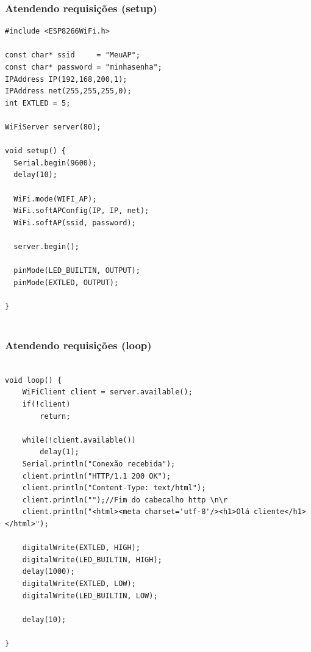 \documentclass{beamer}
\begin{document}
\begin{frame}[fragile]
\frametitle{Atendendo requisições (setup)}

\tiny
\begin{lstlisting}
#include <ESP8266WiFi.h>

const char* ssid     = "MeuAP";
const char* password = "minhasenha";
IPAddress IP(192,168,200,1);
IPAddress net(255,255,255,0);
int EXTLED = 5;

WiFiServer server(80);

void setup() {
  Serial.begin(9600);
  delay(10);

  WiFi.mode(WIFI_AP); 
  WiFi.softAPConfig(IP, IP, net);
  WiFi.softAP(ssid, password);

  server.begin();

  pinMode(LED_BUILTIN, OUTPUT);
  pinMode(EXTLED, OUTPUT);

}


\end{lstlisting}

\end{frame}


\begin{frame}[fragile]
\frametitle{Atendendo requisições (loop)}

\tiny
\begin{lstlisting}

void loop() {
    WiFiClient client = server.available();
    if(!client)
        return;
        
    while(!client.available())
        delay(1);
    Serial.println("Conexão recebida");
    client.println("HTTP/1.1 200 OK");
    client.println("Content-Type: text/html");
    client.println("");//Fim do cabecalho http \n\r
    client.println("<html><meta charset='utf-8'/><h1>Olá cliente</h1></html>");

    digitalWrite(EXTLED, HIGH);
    digitalWrite(LED_BUILTIN, HIGH);
    delay(1000);
    digitalWrite(EXTLED, LOW);
    digitalWrite(LED_BUILTIN, LOW);

    delay(10);
  
}
 
\end{lstlisting}
\end{frame}
\end{document}

